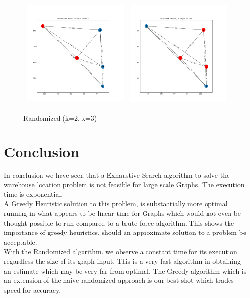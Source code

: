\documentclass[longpaper, english, final, times]{revdetua}
\begin{document}
		\begin{figure}[!h]
			\begin{tabular}{cc}
				\includegraphics[width=0.5\linewidth]{imgs/randomized_n5_k2.png} &   \includegraphics[width=0.5\linewidth]{imgs/randomized_n5_k3.png} \\
			\end{tabular}
			\caption{Randomized (k=2, k=3)}
			\label{figure:randomizedk2_k3}
		\end{figure}
	
	\newpage
	\section{\label{outline:conclusion} Conclusion}
		In conclusion we have seen that a Exhaustive-Search algorithm to solve the warehouse location problem is not feasible for large scale Graphs. The execution time is exponential. \\
		
		A Greedy Heuristic solution to this problem, is substantially more optimal running in what appears to be linear time for Graphs which would not even be thought possible to run compared to a brute force algorithm. This shows the importance of greedy heuristics, should an approximate solution to a problem be acceptable.\\
		
		With the Randomized algorithm, we observe a constant time for its execution regardless the size of its graph input. This is a very fast algorithm in obtaining an estimate which may be very far from optimal. The Greedy algorithm which is an extension of the naive randomized approach is our best shot which trades speed for accuracy.
	
	
%	 
	
\end{document}
